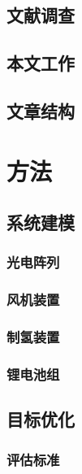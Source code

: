 \documentclass{HEBUTMaster}   %
\begin{document}
\section{文献调查} 

\section{本文工作}

\section{文章结构}


\chapter{方法}
\section{系统建模}

\subsection{光电阵列}

\subsection{风机装置}

\subsection{制氢装置}

\subsection{锂电池组}

\section{目标优化}

\subsection{评估标准}
\end{document}
